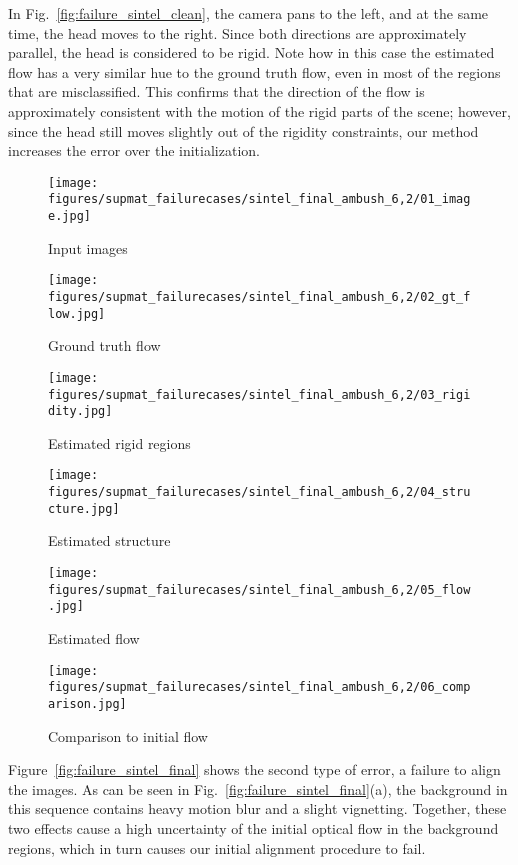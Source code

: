 \documentclass[10pt,twocolumn,letterpaper]{article}
\begin{document}
In Fig.~\ref{fig:failure_sintel_clean}, the camera pans to the left, and at the same time, the head moves to the right. Since both directions are approximately parallel, the head is considered to be rigid.
Note how in this case the estimated flow has a very similar hue to the ground truth flow, even in most of the regions that are misclassified.
This confirms that the direction of the flow is approximately consistent with the motion of the rigid parts of the scene; however, since the head still moves slightly out of the rigidity constraints, our method increases the error over the initialization.


\begin{figure*}[h!]
\captionsetup{justification=centering}
\centering
\begin{subfigure}[t]{\failurewidth}
	\texttt{[image: figures/supmat\_failurecases/sintel\_final\_ambush\_6,2/01\_image.jpg]}
	\caption{Input images}
\end{subfigure}\begin{subfigure}[t]{\failurewidth}
	\texttt{[image: figures/supmat\_failurecases/sintel\_final\_ambush\_6,2/02\_gt\_flow.jpg]}
	\caption{Ground truth flow}
\end{subfigure}\begin{subfigure}[t]{\failurewidth}
	\texttt{[image: figures/supmat\_failurecases/sintel\_final\_ambush\_6,2/03\_rigidity.jpg]}
	\caption{Estimated rigid regions}
\end{subfigure}
\begin{subfigure}[t]{\failurewidth}
	\texttt{[image: figures/supmat\_failurecases/sintel\_final\_ambush\_6,2/04\_structure.jpg]}
	\caption{Estimated structure}
\end{subfigure}\begin{subfigure}[t]{\failurewidth}
	\texttt{[image: figures/supmat\_failurecases/sintel\_final\_ambush\_6,2/05\_flow.jpg]}
	\caption{Estimated flow}
\end{subfigure}\begin{subfigure}[t]{\failurewidth}
	\texttt{[image: figures/supmat\_failurecases/sintel\_final\_ambush\_6,2/06\_comparison.jpg]}
	\caption{Comparison to initial flow}
\end{subfigure}
\caption{Failure case Sintel final: Strong motion blur destroys the alignment. \\EPE initialization: . EPE MR-Flow: .}
\label{fig:failure_sintel_final}
\end{figure*}

Figure~\ref{fig:failure_sintel_final} shows the second type of error, a failure to align the images.
As can be seen in Fig.~\ref{fig:failure_sintel_final}(a), the background in this sequence contains heavy motion blur and a slight vignetting.
Together, these two effects cause a high uncertainty of the initial optical flow in the background regions, which in turn causes our initial alignment procedure to fail.


 
\end{document}
